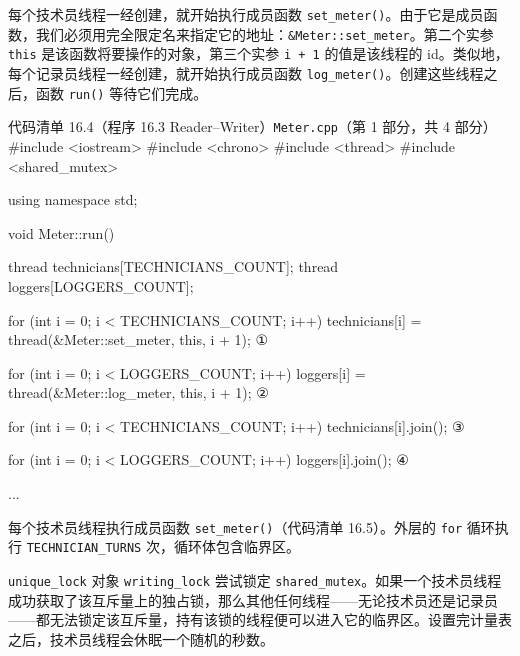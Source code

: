 每个技术员线程一经创建，就开始执行成员函数 \texttt{set\_\allowbreak{}meter(\allowbreak{})\allowbreak{}}。由于它是成员函数，我们必须用完全限定名来指定它的地址：\texttt{\&Meter::\allowbreak{}set\_\allowbreak{}meter}。第二个实参 \texttt{this} 是该函数将要操作的对象，第三个实参 \texttt{i + 1} 的值是该线程的 id。类似地，每个记录员线程一经创建，就开始执行成员函数 \texttt{log\_\allowbreak{}meter(\allowbreak{})\allowbreak{}}。创建这些线程之后，函数 \texttt{run()} 等待它们完成。

\begin{codeboxt}{代码清单 16.4（程序 16.3 Reader–Writer）\texttt{Meter.cpp}（第 1 部分，共 4 部分）}
#include <iostream>
#include <chrono>
#include <thread>
#include <shared_mutex>

using namespace std;

void Meter::run()
{
    thread technicians[TECHNICIANS_COUNT];
    thread loggers[LOGGERS_COUNT];

    for (int i = 0; i < TECHNICIANS_COUNT; i++)
    {
        technicians[i] = thread(&Meter::set_meter, this, i + 1); ①
    }

    for (int i = 0; i < LOGGERS_COUNT; i++)
    {
        loggers[i] = thread(&Meter::log_meter, this, i + 1);     ②
    }

    for (int i = 0; i < TECHNICIANS_COUNT; i++)
    {
        technicians[i].join();                                   ③
    }

    for (int i = 0; i < LOGGERS_COUNT; i++)
    {
        loggers[i].join();                                       ④
    }
}

...
\end{codeboxt}
\par
{}\par
{}\par
{}\par

每个技术员线程执行成员函数 \texttt{set\_\allowbreak{}meter(\allowbreak{})\allowbreak{}}（代码清单 16.5）。外层的 \texttt{for} 循环执行 \texttt{TECHNICIAN\_\allowbreak{}TURNS} 次，循环体包含临界区。

\texttt{unique\_\allowbreak{}lock} 对象 \texttt{writing\_\allowbreak{}lock} 尝试锁定 \texttt{shared\_\allowbreak{}mutex}。如果一个技术员线程成功获取了该互斥量上的独占锁，那么其他任何线程——无论技术员还是记录员——都无法锁定该互斥量，持有该锁的线程便可以进入它的临界区。设置完计量表之后，技术员线程会休眠一个随机的秒数。

